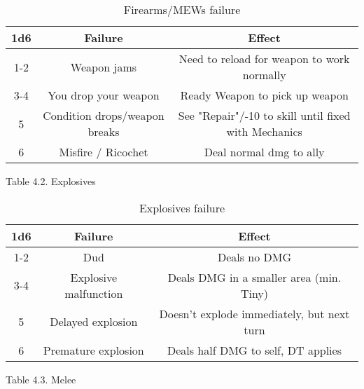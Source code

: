 \documentclass[11pt,a4paper,twocolumn]{book}
\begin{document}
    \begin{table*}[t]
        \centering
        \caption{Firearms/MEWs failure}
        \begin{tabular}{|c|c|c|}
           \hline
           \textbf{1d6}    & \textbf{Failure}              & \textbf{Effect} \\    \hline
                1-2         & Weapon jams                   & Need to reload for weapon to work normally \\
                3-4         & You drop your weapon          & Ready Weapon to pick up weapon             \\
                5           & Condition drops/weapon breaks & See "Repair"/-10 to skill until fixed with Mechanics  \\
                6           & Misfire / Ricochet            & Deal normal dmg to ally \\ \hline 
        \end{tabular}
        \label{tab:my_label}
    \end{table*}
    
    Table 4.2. Explosives

    \begin{table*}[t]
        \centering
        \caption{Explosives failure}
        \begin{tabular}{|c|c|c|}
           \hline
           \textbf{1d6}    & \textbf{Failure}      & \textbf{Effect} \\    \hline
                1-2         & Dud                   & Deals no DMG           \\
                3-4         & Explosive malfunction & Deals DMG in a smaller area (min. Tiny)  \\
                5           & Delayed explosion     & Doesn't explode immediately, but next turn \\
                6           & Premature explosion   & Deals half DMG to self, DT applies       \\ \hline
        \end{tabular}
        \label{tab:my_label}
    \end{table*}

    Table 4.3. Melee
    
\end{document}

